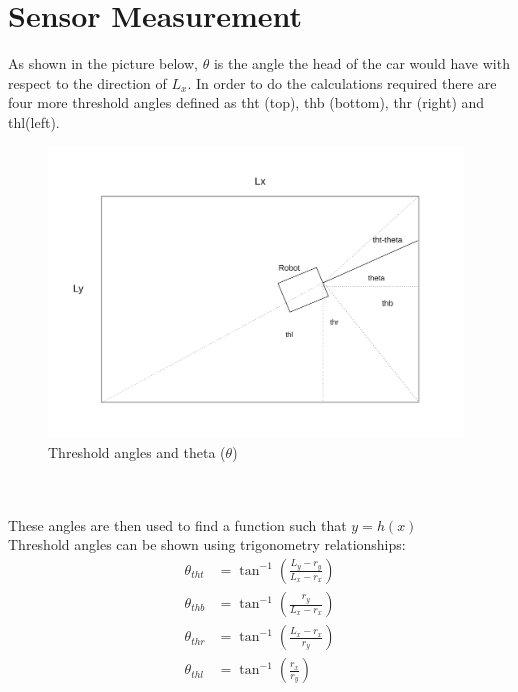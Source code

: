 \documentclass[12pt, letterpaper]{amsart} %
\numberwithin{equation}{section}
\begin{document}
\section{Sensor Measurement}
As shown in the picture below, $\theta$ is the angle the head of the car would have with respect to the direction of $L_x$. In order to do the calculations required there are four more threshold angles defined as tht (top), thb (bottom), thr (right) and thl(left). 
\begin{figure}[h!]
\includegraphics[width=110mm]{./img/fig_2.png}
\caption{Threshold angles and theta ($\theta$)}
\label{fig:figure2}
\end{figure}
\\
\\
These angles are then used to find a function such that $y = h(x)$ \\
Threshold angles can be shown using trigonometry relationships:
\begin{align*}
  \theta_{tht} &= \tan^{-1}(\frac{L_y - r_y}{L_x - r_x}) \\
  \theta_{thb} &= \tan^{-1}(\frac{r_y}{L_x - r_x}) \\
  \theta_{thr} &= \tan^{-1}(\frac{L_x-r_x}{r_y}) \\
  \theta_{thl} &= \tan^{-1}(\frac{r_x}{r_y})
\end{align*}
\end{document}
